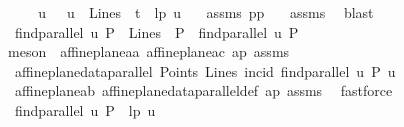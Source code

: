 \begin{isabellebody}
%
\isadelimproof
\isanewline
%
\endisadelimproof
%
\isatagproof
{}\isamarkupfalse%
\ {\isacharminus}{\kern0pt}\isanewline
\ \ \isamarkupfalse%
\ u\ \ {}{\isacharcolon}{\kern0pt}{\isachardoublequoteopen}\ {\isacharparenleft}{\kern0pt}u\ {\isasymin}\ Lines{\isacharparenright}{\kern0pt}\ {\isasymand}\ {\isacharparenleft}{\kern0pt}t\ {\isacharequal}{\kern0pt}\ lp\ u{\isacharparenright}{\kern0pt}{\isachardoublequoteclose}\ \ \isamarkupfalse%
\ assms{\isacharparenleft}{\kern0pt}{}{\isacharparenright}{\kern0pt}\ pp\ \ \isamarkupfalse%
\ assms{\isacharparenleft}{\kern0pt}{}{\isacharparenright}{\kern0pt}\ \isamarkupfalse%
\ blast\isanewline
\ \ \isamarkupfalse%
\ {}{\isacharcolon}{\kern0pt}\ {\isachardoublequoteopen}{\isacharparenleft}{\kern0pt}find{\isacharunderscore}{\kern0pt}parallel\ u\ P{\isacharparenright}{\kern0pt}\ {\isasymin}\ Lines\ {\isasymand}\ P\ {\isasymlhd}\ {\isacharparenleft}{\kern0pt}find{\isacharunderscore}{\kern0pt}parallel\ u\ P{\isacharparenright}{\kern0pt}{\isachardoublequoteclose}\ \isanewline
\ \ \ \ \isamarkupfalse%
\ {\isacharparenleft}{\kern0pt}meson\ {\isachardoublequoteopen}{}{\isachardoublequoteclose}\ affine{\isacharunderscore}{\kern0pt}plane{\isachardot}{\kern0pt}a{}a\ affine{\isacharunderscore}{\kern0pt}plane{\isachardot}{\kern0pt}a{}c\ ap\ assms{\isacharparenleft}{\kern0pt}{}{\isacharparenright}{\kern0pt}{\isacharparenright}{\kern0pt}\isanewline
\ \ \isamarkupfalse%
\ {}{\isacharcolon}{\kern0pt}\ {\isachardoublequoteopen}affine{\isacharunderscore}{\kern0pt}plane{\isacharunderscore}{\kern0pt}data{\isachardot}{\kern0pt}parallel\ Points\ Lines\ incid\ {\isacharparenleft}{\kern0pt}find{\isacharunderscore}{\kern0pt}parallel\ u\ P{\isacharparenright}{\kern0pt}\ u{\isachardoublequoteclose}\isanewline
\ \ \ \ \isamarkupfalse%
\ {\isachardoublequoteopen}{}{\isachardoublequoteclose}\ affine{\isacharunderscore}{\kern0pt}plane{\isachardot}{\kern0pt}a{}b\ affine{\isacharunderscore}{\kern0pt}plane{\isacharunderscore}{\kern0pt}data{\isachardot}{\kern0pt}parallel{\isacharunderscore}{\kern0pt}def\ ap\ assms{\isacharparenleft}{\kern0pt}{}{\isacharparenright}{\kern0pt}\ \isamarkupfalse%
\ fastforce\isanewline
\isanewline
\ \ \isamarkupfalse%
\ {}{\isacharcolon}{\kern0pt}\ {\isachardoublequoteopen}{\isacharparenleft}{\kern0pt}find{\isacharunderscore}{\kern0pt}parallel\ u\ P{\isacharparenright}{\kern0pt}\ {\isasymin}\ lp\ u{\isachardoublequoteclose}\ \isamarkupfalse%

\end{isabellebody}
